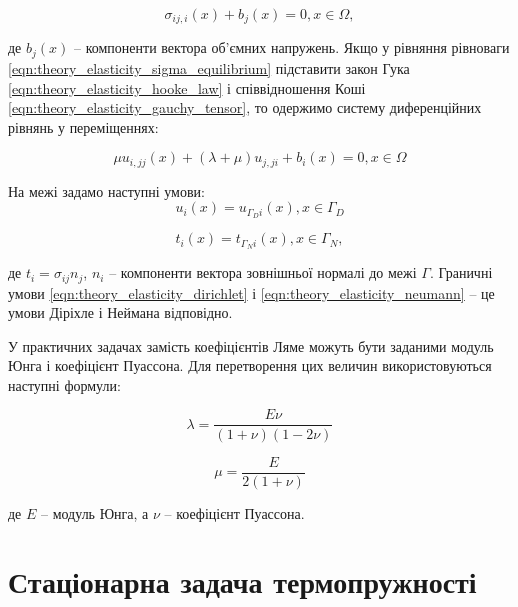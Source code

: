 \begin{equation}
    \label{eqn:theory_elasticity_sigma_equilibrium}
    \sigma_{ij,i}(x) + b_j(x) = 0, x \in \Omega,
\end{equation}

\noindent де $b_j(x)$ -- компоненти вектора об'ємних напружень. Якщо у рівняння рівноваги 
\ref{eqn:theory_elasticity_sigma_equilibrium} підставити закон Гука \ref{eqn:theory_elasticity_hooke_law} і 
співвідношення Коші \ref{eqn:theory_elasticity_gauchy_tensor}, то одержимо систему диференційних рівнянь у переміщеннях:

\begin{equation}
    \label{eqn:theory_elasticity_displacement_eqn}
    \mu u_{i,jj}(x) + (\lambda + \mu)u_{j,ji} + b_i(x) = 0, x \in \Omega
\end{equation}

\noindent На межі задамо наступні умови:
\begin{equation}
    \label{eqn:theory_elasticity_dirichlet}
    u_i(x) = u_{\Gamma_Di}(x), x \in \Gamma_D
\end{equation}

\begin{equation}
    \label{eqn:theory_elasticity_neumann}
    t_i(x) = t_{\Gamma_Ni}(x), x \in \Gamma_N,
\end{equation}

\noindent де $t_i = \sigma_{ij}n_j$, $n_i$ -- компоненти вектора зовнішньої нормалі до межі $\Gamma$. Граничні умови 
\ref{eqn:theory_elasticity_dirichlet} і \ref{eqn:theory_elasticity_neumann} -- це умови Діріхле і Неймана відповідно.

У практичних задачах замість коефіцієнтів Ляме можуть бути заданими  модуль Юнга і коефіцієнт Пуассона. Для перетворення
цих величин використовуються наступні формули: 

\begin{equation}
    \label{eqn:theory_elasticity_lame_lambda_convertion}
    \lambda = \frac{E\nu}{(1+\nu)(1-2\nu)}
\end{equation}

\begin{equation}
    \label{eqn:theory_elasticity_lame_mu_convertion}
    \mu = \frac{E}{2(1+\nu)}
\end{equation}

\noindent де $E$ -- модуль Юнга, а $\nu$ -- коефіцієнт Пуассона.  

\section{Стаціонарна задача термопружності}

